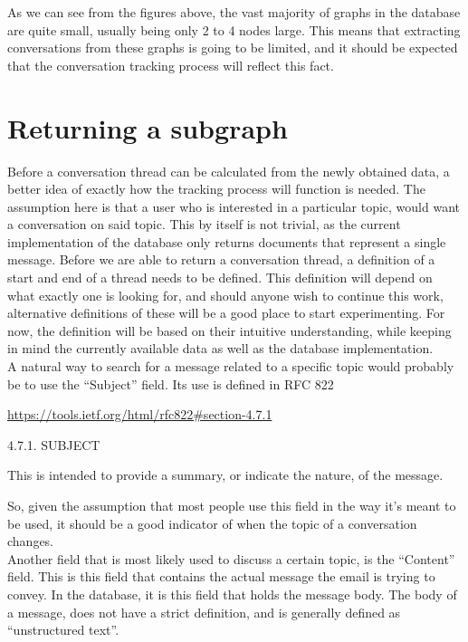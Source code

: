 \documentclass[a4paper,english]{report}
\begin{document}
As we can see from the figures above, the vast majority of graphs in the database are quite small, usually being only 2 to 4 nodes large. This means that extracting conversations from these graphs is going to be limited, and it should be expected that the conversation tracking process will reflect this fact.

\section{Returning a subgraph }
Before a conversation thread can be calculated from the newly obtained data, a better idea of exactly how the tracking process will function is needed. 
The assumption here is that a user who is interested in a particular topic, would want a conversation on said topic. This by itself is not trivial, as the current implementation of the database only returns documents that represent a single message. Before we are able to return a conversation thread, a definition of a start and end of a thread needs to be defined.
This definition will depend on what exactly one is looking for, and should anyone wish to continue this work, alternative definitions of these will be a good place to start experimenting. For now, the definition will be based on their intuitive understanding, while keeping in mind the currently available data as well as the database implementation.\\



A natural way to search for a message related to a specific topic would probably be to use the “Subject” field. Its use is defined in RFC 822 \cite{RFC0822}

\url{https://tools.ietf.org/html/rfc822#section-4.7.1}


\begin{displayquote}

4.7.1.  SUBJECT
     
             This is intended to provide a summary,  or  indicate  the
        nature, of the message.



\end{displayquote}

So, given the assumption that most people use this field in the way it's meant to be used, it should be a good indicator of when the topic of a conversation changes. \\

Another field that is most likely used to discuss a certain topic, is the “Content” field. This is this field that contains the actual message the email is trying to convey. In the database, it is this field that holds the message body.
The body of a message, does not have a strict definition, and is generally defined as “unstructured text”.\\
\end{document}
